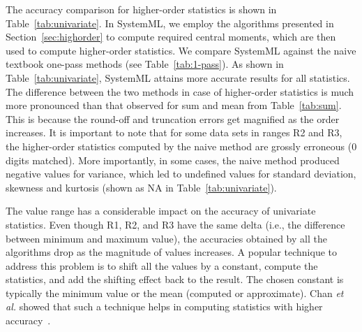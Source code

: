 The accuracy comparison for higher-order statistics is shown in Table~\ref{tab:univariate}. In SystemML, we employ the algorithms presented in Section~\ref{sec:highorder} to compute required central moments, which are then used to compute higher-order statistics. We compare SystemML against the naive textbook one-pass methods (see Table~\ref{tab:1-pass}). As shown in Table~\ref{tab:univariate}, SystemML attains more accurate results for all statistics. The difference between the two methods in case of higher-order statistics is much more pronounced than that observed for sum and mean from Table~\ref{tab:sum}. This is because the round-off and truncation errors get magnified as the order increases. It is important to note that for some data sets in ranges R2 and R3, the higher-order statistics computed by the naive method are grossly erroneous ($0$ digits matched). More importantly, in some cases, the naive method produced negative values for variance, which led to undefined values for standard deviation, skewness and kurtosis (shown as NA in Table~\ref{tab:univariate}). 


The value range has a considerable impact on the accuracy of univariate statistics. Even though R1, R2, and R3 have the same delta (i.e., the difference between minimum and maximum value), the accuracies obtained by all the algorithms drop as the magnitude of values increases. A popular technique to address this problem is to shift all the values by a constant, compute the statistics, and add the shifting effect back to the result. The chosen constant is typically the minimum value or the mean (computed or approximate). Chan {\em et al.} showed that such a technique helps in computing statistics with higher accuracy~\cite{variance}. 


